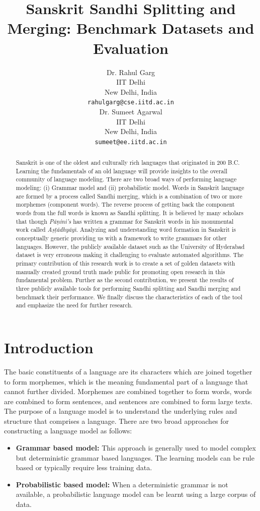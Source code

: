 \documentclass[11pt]{article}
\title{Sanskrit Sandhi Splitting and Merging: Benchmark Datasets and Evaluation}
\author{Dr. Rahul Garg \\
 IIT Delhi \\
  New Delhi, India \\
  {\tt rahulgarg@cse.iitd.ac.in} \\\And
  Dr. Sumeet Agarwal \\
  IIT Delhi \\
 New Delhi, India \\
  {\tt sumeet@ee.iitd.ac.in} \\}
\date{}
\begin{document}
\maketitle
\begin{abstract}
	Sanskrit is one of the oldest and culturally rich languages that originated in 200 B.C. Learning the fundamentals of an old language will provide insights to the overall community of language modeling. There are two broad ways of performing language modeling: (i) Grammar model and (ii) probabilistic model. Words in Sanskrit language are formed by a process called Sandhi merging, which is a combination of two or more morphemes (component words). The reverse process of getting back the component words from the full words is known as Sandhi splitting. It is believed by many scholars that though \textit{P\={a}\d{n}ini's} has written a grammar for Sanskrit words in his monumental work called \textit{A\d{s}\d{t}\={a}dhy\={a}y\={\i}}. Analyzing and understanding word formation in Sanskrit is conceptually generic providing us with a framework to write grammars for other languages. However, the publicly available dataset such as the University of Hyderabad dataset is very erroneous making it challenging to evaluate automated algorithms. The primary contribution of this research work is to create a set of golden datasets with manually created ground truth made public for promoting open research in this fundamental problem. Further as the second contribution, we present the results of three publicly available tools for performing Sandhi splitting and Sandhi merging and benchmark their performance. We finally discuss the characteristics of each of the tool and emphasize the need for further research.
\end{abstract}

\section{Introduction}

The basic constituents of a language are its characters which are joined together to form morphemes, which is the meaning fundamental part of a language that cannot further divided. Morphemes are combined together to form words, words are combined to form sentences, and sentences are combined to form large texts. The purpose of a language model is to understand the underlying rules and structure that comprises a language. There are two broad approaches for constructing a language model as follows:
\begin{itemize}
	\item \textbf{Grammar based model:} This approach is generally used to model complex but deterministic grammar based languages. The learning models can be rule based or typically require less training data.
	\item \textbf{Probabilistic based model:} When a deterministic grammar is not available, a probabilistic language model can be learnt using a large corpus of data.
\end{itemize}
\end{document}
